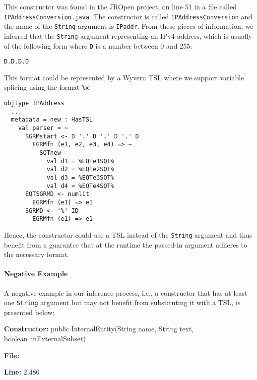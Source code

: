 \vspace{10px}


This constructor was found in the JROpen project, on line 51 in a file called \mbox{\lstinline{IPAddressConversion.java}}. The constructor is called \lstinline{IPAddressConversion} and the name of the \lstinline{String} argument is \lstinline{IPaddr}. From these pieces of information, we inferred that the \lstinline{String} argument representing an IPv4 address, which is usually of the following form where \lstinline{D} is a number between 0 and 255:

\begin{lstlisting}[numbers=none]
D.D.D.D
\end{lstlisting}

This format could be represented by a Wyvern TSL where we support variable splicing using the format \lstinline{%x}:

\begin{lstlisting}
objtype IPAddress
  ...
  metadata = new : HasTSL
    val parser = ~
      SGRMstart <- D '.' D '.' D '.' D
        EGRMfn (e1, e2, e3, e4) => ~
          SQTnew
            val d1 = %EQTe1SQT%
            val d2 = %EQTe2SQT%
            val d3 = %EQTe3SQT%
            val d4 = %EQTe4SQT%
      EQTSGRMD <- numlit
        EGRMfn (e1) => e1
      SGRMD <- '%' ID
        EGRMfn (e1) => e1
\end{lstlisting}

Hence, the constructor could use a TSL instead of the \lstinline{String} argument and thus benefit from a guarantee that at the runtime the passed-in argument adheres to the necessary format.


\paragraph{Negative Example} A negative example in our inference process, i.e., a constructor that has at least one \lstinline{String} argument but may not benefit from substituting it with a TSL, is presented below:

\vspace{10px}

\begin{small}

\noindent \textbf{Constructor:} public InternalEntity(String name, String text, \mbox{boolean inExternalSubset})

\noindent \textbf{File:} 

\noindent \textbf{Line:} 2,486

\end{small}

